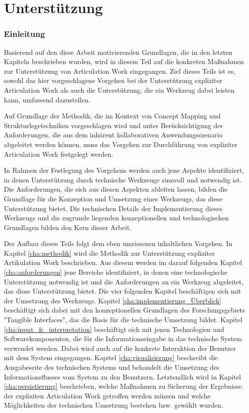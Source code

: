 \part{Unterstützung} %
\label{prt:umsetzung}

\section*{Einleitung} %
\label{sec:umsetzung_einleitung}
\thispagestyle{empty}

Basierend auf den diese Arbeit motivierenden Grundlagen, die in den letzten Kapiteln beschrieben wurden, wird in diesem Teil auf die konkreten Maßnahmen zur Unterstützung von Articulation Work eingegangen. Ziel dieses Teils ist es, sowohl das hier vorgeschlagene Vorgehen bei der Unterstützung expliziter Articulation Work als auch die Unterstützung, die ein Werkzeug dabei leisten kann, umfassend dazustellen.

Auf Grundlage der Methodik, die im Kontext von Concept Mapping und Strukturlegetechniken vorgeschlagen wird und unter Berücksichtigung der Anforderungen, die aus dem inhärent kollaborativen Anwendungsszenario abgeleitet werden können, muss das Vorgehen zur Durchführung von expliziter Articulation Work festgelegt werden. 

In Rahmen der Festlegung des Vorgehens werden auch jene Aspekte identifiziert, in denen Unterstützung durch technische Werkzeuge sinnvoll und notwendig ist. Die Anforderungen, die sich aus diesen Aspekten ableiten lassen, bilden die Grundlage für die Konzeption und Umsetzung eines Werkzeugs, das diese Unterstützung bietet. Die technischen Details der Implementierung dieses Werkzeugs und die zugrunde liegenden konzeptionellen und technologischen Grundlagen bilden den Kern dieser Arbeit.

Der Aufbau dieses Teils folgt dem eben umrissenen inhaltlichen Vorgehen. In Kapitel \ref{cha:methodik} wird die Methodik zur Unterstützung expliziter Artikulation Work beschrieben. Aus diesem werden im darauf folgenden Kapitel \ref{cha:anforderungen} jene Bereiche identifiziert, in denen eine technologische Unterstützung notwendig ist und die Anforderungen an ein Werkzeug abgeleitet, das diese Unterstützung bietet. Die vier folgenden Kapitel beschäftigen sich mit der Umsetzung des Werkzeugs. Kapitel \ref{cha:implementierung_Überblick} beschäftigt sich dabei mit den konzeptionellen Grundlagen des Forschungsgebiets "Tangible Interfaces", das die Basis für die technische Umsetzung bildet. Kapitel \ref{cha:input_&_interpretation} beschäftigt sich mit jenen Technologien und Softwarekomponenten, die für die Informationseingabe in das technische System verwendet werden. Dabei wird auch auf die konkrete Interaktion der Benutzer mit dem System eingegangen. Kapitel \ref{cha:visualisierung} beschreibt die Ausgabeseite des technischen Systems und behandelt die Umsetzung des Informationsflusses vom System zu den Benutzern. Letztendlich wird in Kapitel \ref{cha:persistierung} beschrieben, welche Maßnahmen zu Sicherung der Ergebnisse der expliziten Articulation Work getroffen werden müssen und welche Möglichkeiten der technischen Umsetzung bestehen bzw. gewählt wurden.

